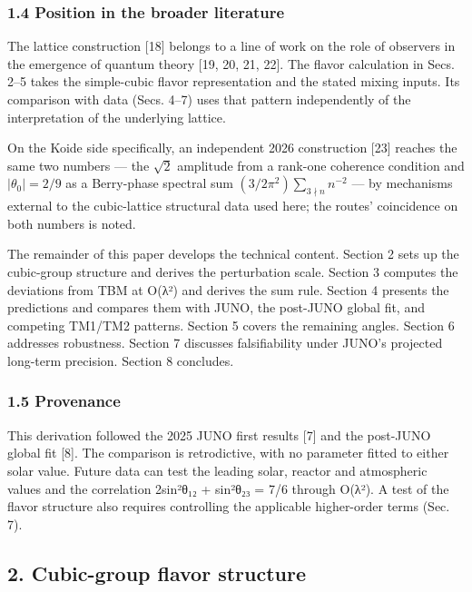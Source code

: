 \documentclass[
]{article}
\begin{document}
\hypertarget{position-in-the-broader-literature}{%
\subsubsection{1.4 Position in the broader
literature}\label{position-in-the-broader-literature}}

The lattice construction {[}18{]} belongs to a line of work on the role
of observers in the emergence of quantum theory {[}19, 20, 21, 22{]}.
The flavor calculation in Secs. 2--5 takes the simple-cubic flavor
representation and the stated mixing inputs. Its comparison with data
(Secs. 4--7) uses that pattern independently of the interpretation of
the underlying lattice.

On the Koide side specifically, an independent 2026 construction
{[}23{]} reaches the same two numbers --- the \(\sqrt{2}\) amplitude
from a rank-one coherence condition and \(|\theta_0| = 2/9\) as a
Berry-phase spectral sum \((3/2\pi^2)\sum_{3\nmid n} n^{-2}\) --- by
mechanisms external to the cubic-lattice structural data used here; the
routes' coincidence on both numbers is noted.

The remainder of this paper develops the technical content. Section 2
sets up the cubic-group structure and derives the perturbation scale.
Section 3 computes the deviations from TBM at O(λ²) and derives the sum
rule. Section 4 presents the predictions and compares them with JUNO,
the post-JUNO global fit, and competing TM1/TM2 patterns. Section 5
covers the remaining angles. Section 6 addresses robustness. Section 7
discusses falsifiability under JUNO's projected long-term precision.
Section 8 concludes.

\hypertarget{provenance}{%
\subsubsection{1.5 Provenance}\label{provenance}}

This derivation followed the 2025 JUNO first results {[}7{]} and the
post-JUNO global fit {[}8{]}. The comparison is retrodictive, with no
parameter fitted to either solar value. Future data can test the leading
solar, reactor and atmospheric values and the correlation 2sin²θ₁₂ +
sin²θ₂₃ = 7/6 through O(λ²). A test of the flavor structure also
requires controlling the applicable higher-order terms (Sec. 7).

\hypertarget{cubic-group-flavor-structure}{%
\subsection{2. Cubic-group flavor
structure}\label{cubic-group-flavor-structure}}
\end{document}
